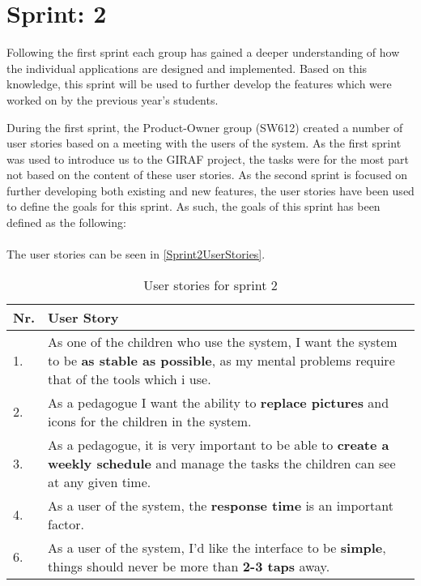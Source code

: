 \chapter{Sprint: 2}
Following the first sprint each group has gained a deeper understanding of how
the individual applications are designed and implemented. Based on this
knowledge, this sprint will be used to further develop the features which were
worked on by the previous year's students.\nl

During the first sprint, the Product-Owner group (SW612) created a number of
user stories based on a meeting with the users of the system. As the first
sprint was used to introduce us to the GIRAF project, the tasks were for the
most part not based on the content of these user stories. As the second sprint
is focused on further developing both existing and new features, the user
stories have been used to define the goals for this sprint. As such, the goals
of this sprint has been defined as the following:\\
\\
The user stories can be seen in \autoref{Sprint2UserStories}.

\begin{table}[H]
\centering 
\begin{tabular}{|l|p{12.5cm}|}
\hline
Nr. & User Story \\\hline
1. & As one of the children who use the system, I want the system to be 
\textbf{as stable as possible}, as my mental problems require that of the tools
which i use. \\ \hline
2. & As a pedagogue I want the ability to \textbf{replace pictures} and icons
for the children in the system.\\ \hline
3. & As a pedagogue, it is very important to be able to \textbf{create a weekly
schedule} and manage the tasks the children can see at any given time.\\ \hline
4. & As a user of the system, the \textbf{response time} is an important
factor.\\ \hline
6. & As a user of the system, I'd like the interface to be \textbf{simple},
things should never be more than \textbf{2-3 taps} away. \\\hline
\end{tabular}
\caption{User stories for sprint 2}
\label{Sprint2UserStories}
\end{table}

